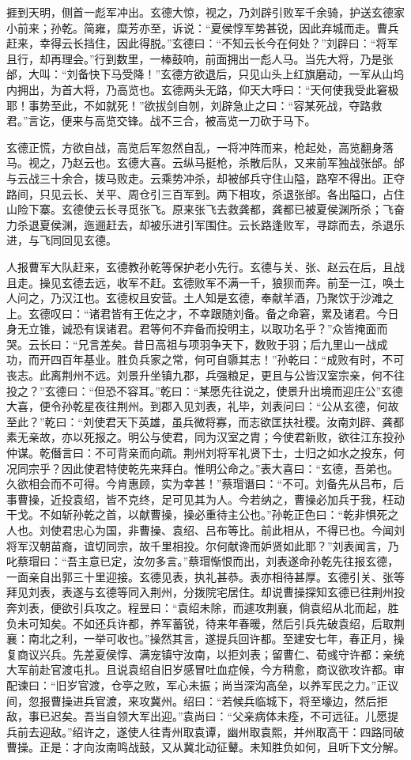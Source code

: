 捱到天明，侧首一彪军冲出。玄德大惊，视之，乃刘辟引败军千余骑，护送玄德家小前来；孙乾。简雍，糜芳亦至，诉说：“夏侯惇军势甚锐，因此弃城而走。曹兵赶来，幸得云长挡住，因此得脱。”玄德曰：“不知云长今在何处？”刘辟曰：“将军且行，却再理会。”行到数里，一棒鼓响，前面拥出一彪人马。当先大将，乃是张邰，大叫：“刘备快下马受降！”玄德方欲退后，只见山头上红旗磨动，一军从山坞内拥出，为首大将，乃高览也。玄德两头无路，仰天大呼曰：“天何使我受此窘极耶！事势至此，不如就死！”欲拔剑自刎，刘辟急止之曰：“容某死战，夺路救君。”言讫，便来与高览交锋。战不三合，被高览一刀砍于马下。

玄德正慌，方欲自战，高览后军忽然自乱，一将冲阵而来，枪起处，高览翻身落马。视之，乃赵云也。玄德大喜。云纵马挺枪，杀散后队，又来前军独战张邰。邰与云战三十余合，拨马败走。云乘势冲杀，却被邰兵守住山隘，路窄不得出。正夺路间，只见云长、关平、周仓引三百军到。两下相攻，杀退张邰。各出隘口，占住山险下寨。玄德使云长寻觅张飞。原来张飞去救龚都，龚都已被夏侯渊所杀；飞奋力杀退夏侯渊，迤逦赶去，却被乐进引军围住。云长路逢败军，寻踪而去，杀退乐进，与飞同回见玄德。

人报曹军大队赶来，玄德教孙乾等保护老小先行。玄德与关、张、赵云在后，且战且走。操见玄德去远，收军不赶。玄德败军不满一千，狼狈而奔。前至一江，唤土人问之，乃汉江也。玄德权且安营。土人知是玄德，奉献羊酒，乃聚饮于沙滩之上。玄德叹曰：“诸君皆有王佐之才，不幸跟随刘备。备之命窘，累及诸君。今日身无立锥，诚恐有误诸君。君等何不弃备而投明主，以取功名乎？”众皆掩面而哭。云长曰：“兄言差矣。昔日高祖与项羽争天下，数败于羽；后九里山一战成功，而开四百年基业。胜负兵家之常，何可自隳其志！”孙乾曰：“成败有时，不可丧志。此离荆州不远。刘景升坐镇九郡，兵强粮足，更且与公皆汉室宗亲，何不往投之？”玄德曰：“但恐不容耳。”乾曰：“某愿先往说之，使景升出境而迎庄公”玄德大喜，便令孙乾星夜往荆州。到郡入见刘表，礼毕，刘表问曰：“公从玄德，何故至此？”乾曰：“刘使君天下英雄，虽兵微将寡，而志欲匡扶社稷。汝南刘辟、龚都素无亲故，亦以死报之。明公与使君，同为汉室之胄；今使君新败，欲往江东投孙仲谋。乾僭言曰：不可背亲而向疏。荆州刘将军礼贤下士，士归之如水之投东，何况同宗乎？因此使君特使乾先来拜白。惟明公命之。”表大喜曰：“玄德，吾弟也。久欲相会而不可得。今肯惠顾，实为幸甚！”蔡瑁谮曰：“不可。刘备先从吕布，后事曹操，近投袁绍，皆不克终，足可见其为人。今若纳之，曹操必加兵于我，枉动干戈。不如斩孙乾之首，以献曹操，操必重待主公也。”孙乾正色曰：“乾非惧死之人也。刘使君忠心为国，非曹操、袁绍、吕布等比。前此相从，不得已也。今闻刘将军汉朝苗裔，谊切同宗，故千里相投。尔何献谗而妒贤如此耶？”刘表闻言，乃叱蔡瑁曰：“吾主意已定，汝勿多言。”蔡瑁惭恨而出，刘表遂命孙乾先往报玄德，一面亲自出郭三十里迎接。玄德见表，执礼甚恭。表亦相待甚厚。玄德引关、张等拜见刘表，表遂与玄德等同入荆州，分拨院宅居住。却说曹操探知玄德已往荆州投奔刘表，便欲引兵攻之。程昱曰：“袁绍未除，而遽攻荆襄，倘袁绍从北而起，胜负未可知矣。不如还兵许都，养军蓄锐，待来年春暖，然后引兵先破袁绍，后取荆襄：南北之利，一举可收也。”操然其言，遂提兵回许都。至建安七年，春正月，操复商议兴兵。先差夏侯惇、满宠镇守汝南，以拒刘表；留曹仁、荀彧守许都：亲统大军前赴官渡屯扎。且说袁绍自旧岁感冒吐血症候，今方稍愈，商议欲攻许都。审配谏曰：“旧岁官渡，仓亭之败，军心未振；尚当深沟高垒，以养军民之力。”正议间，忽报曹操进兵官渡，来攻冀州。绍曰：“若候兵临城下，将至壕边，然后拒敌，事已迟矣。吾当自领大军出迎。”袁尚曰：“父亲病体未痊，不可远征。儿愿提兵前去迎敌。”绍许之，遂使人往青州取袁谭，幽州取袁熙，并州取高干：四路同破曹操。正是：才向汝南鸣战鼓，又从冀北动征鼙。未知胜负如何，且听下文分解。